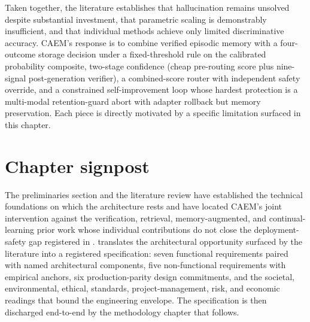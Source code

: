 Taken together, the literature establishes that hallucination remains unsolved despite substantial investment, that parametric scaling is demonstrably insufficient, and that individual methods achieve only limited discriminative accuracy. CAEM's response is to combine verified episodic memory with a four-outcome storage decision under a fixed-threshold rule on the calibrated probability composite, two-stage confidence (cheap pre-routing score plus nine-signal post-generation verifier), a combined-score router with independent safety override, and a constrained self-improvement loop whose hardest protection is a multi-modal retention-guard abort with adapter rollback but memory preservation. Each piece is directly motivated by a specific limitation surfaced in this chapter.

\section{Chapter signpost}
\label{sec:ch2-signpost}

The preliminaries section and the literature review have established the technical foundations on which the architecture rests and have located CAEM's joint intervention against the verification, retrieval, memory-augmented, and continual-learning prior work whose individual contributions do not close the deployment-safety gap registered in .  translates the architectural opportunity surfaced by the literature into a registered specification: seven functional requirements paired with named architectural components, five non-functional requirements with empirical anchors, six production-parity design commitments, and the societal, environmental, ethical, standards, project-management, risk, and economic readings that bound the engineering envelope. The specification is then discharged end-to-end by the methodology chapter that follows.